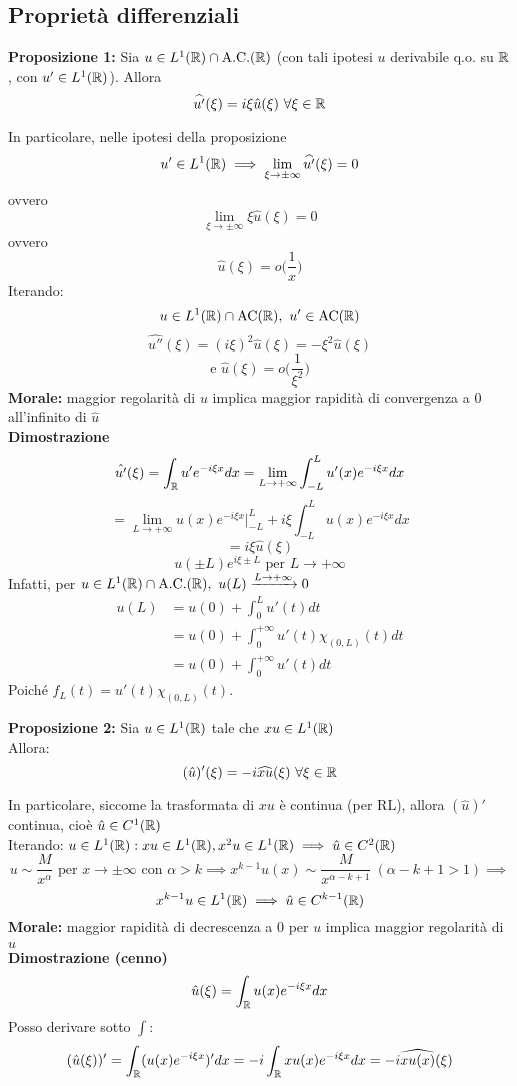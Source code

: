 \subsection{Proprietà differenziali}
\begin{tcolorbox}
	\textbf{Proposizione 1:} Sia $u\in L^{1}(\mathbb{R})\cap \text{A.C.}(\mathbb{R})$ (con tali ipotesi $u$ derivabile q.o. su $\mathbb{R}$, con $u'\in L^{1}(\mathbb{R})$). Allora
	\[\widehat{u'}(\xi)=i\xi \hat{u}(\xi) \ \forall \xi \in \mathbb{R}\]
\end{tcolorbox}
	In particolare, nelle ipotesi della proposizione
	\[u'\in L^{1}(\mathbb{R})\implies \lim_{\xi \to \pm \infty} \widehat{u'}(\xi)=0\]
	ovvero 
	\[\lim_{\xi \to \pm \infty} \xi \hat{u}(\xi)=0\]
	ovvero
	\[\hat{u}(\xi)=o \bigg(\frac{1}{x}\bigg)\]
	Iterando:\[u\in L^{1}(\mathbb{R})\cap \text{AC}(\mathbb{R}), \ u'\in \text{AC}(\mathbb{R})\]
	\[\widehat{u''}(\xi)=(i\xi)^2\hat{u}(\xi)=-\xi^2\hat{u}(\xi)\]
	\[\text{e }\hat{u}(\xi)=o\bigg(\frac{1}{\xi^2}\bigg)\]
\textbf{Morale:} maggior regolarità di $u$ implica maggior rapidità di convergenza a 0 all'infinito di $\hat{u}$ 
\\\textbf{Dimostrazione} 
\[\hat{u'}(\xi)=\int_{\mathbb{R}}^{} u'e^{-i\xi x}dx=\lim_{L \to +\infty} \int_{-L}^{L} u'(x)e^{-i\xi x}dx\]
\[=\lim_{L \to +\infty} u(x)e^{-i\xi x}\biggr\rvert_{-L}^L+i\xi\int_{-L}^{L} u(x)e^{-i\xi x}dx\] 
\[=i\xi \hat{u}(\xi)\]
\[u(\pm L)e^{i\xi \pm L}\text{ per }L\to +\infty\]
Infatti, per $u\in L^{1}(\mathbb{R})\cap \text{A.C.}(\mathbb{R}),\ u(L)\xrightarrow{L\to +\infty}0$
\begin{align*}u(L)&=u(0)+\int_{0}^{L} u'(t)dt
\\&=u(0)+\int_{0}^{+\infty} u'(t)\chi_{(0,L)}(t)dt
\\&=u(0)+\int_{0}^{+\infty} u'(t)dt 
\end{align*}
Poiché $f_L(t)=u'(t)\chi_{(0,L)}(t)$.
\begin{tcolorbox}
\textbf{Proposizione 2: }Sia $u\in L^{1}(\mathbb{R})$ tale che $xu\in L^{1}(\mathbb{R})$ 
\\Allora:
\[(\hat{u})'(\xi)=-i \widehat{xu}(\xi)\ \forall \xi \in \mathbb{R}\]
\end{tcolorbox}
In particolare, siccome la trasformata di $xu$ è continua (per RL), allora $(\hat{u})'$ continua, cioè $\hat{u}\in C^1(\mathbb{R})$ 
\\Iterando: $u\in L^{1}(\mathbb{R}):xu\in L^{1}(\mathbb{R}), x^2u\in L^{1}(\mathbb{R})\implies \hat{u}\in C^2(\mathbb{R})$ 
\[u\sim \frac{M}{x^\alpha}\text{ per }x\to \pm \infty\text{ con }\alpha>k\implies x^{k-1}u(x)\sim \frac{M}{x^{\alpha-k+1}}\ (\alpha -k+1>1)\implies \]
\[x^{k-1}u\in L^{1}(\mathbb{R})\implies \hat{u}\in C^{k-1}(\mathbb{R})\]
\textbf{Morale:} maggior rapidità di decrescenza a 0 per $u$ implica maggior regolarità di $\hat{u}$ 
\\\textbf{Dimostrazione (cenno)}
\[\hat{u}(\xi)=\int_{\mathbb{R}}^{} u(x)e^{-i\xi x}dx\]
Posso derivare sotto $\int$:
\[(\hat{u}(\xi))'=\int_{\mathbb{R}}^{} (u(x)e^{-i\xi x})'dx =-i \int_{\mathbb{R}}^{} xu(x)e ^{-i\xi x}dx=-i \widehat{xu(x)}(\xi)\] 

